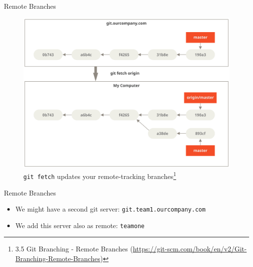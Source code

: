 \documentclass[aspectratio=169]{beamer}
\newcommand{\sectiontitle}{}
\begin{document}
\begin{frame}{Remote Branches}{\sectiontitle}
\begin{figure}
    \centering
    \includegraphics[width=\textwidth,height=0.5\textheight,keepaspectratio]{remote-branches-3}
    \caption{
        \texttt{git fetch} updates your remote-tracking branches\footnote{
            3.5 Git Branching - Remote Branches
            (\url{https://git-scm.com/book/en/v2/Git-Branching-Remote-Branches})
        }
    }
\end{figure}
\end{frame}

\begin{frame}[fragile]{Remote Branches}{\sectiontitle}
\begin{itemize}
    \item We might have a second git server: \verb|git.team1.ourcompany.com|
    \item We add this server also as remote: \verb|teamone|
\end{itemize}
\end{frame}
\end{document}
